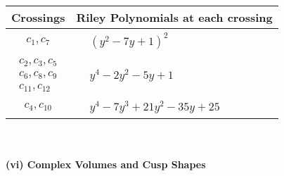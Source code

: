 \documentclass[1p]{elsarticle_modified}
\theoremstyle{definition}
\begin{document}
\begin{tabular}{m{50pt}|m{274pt}}
Crossings & \hspace{64pt}Riley Polynomials at each crossing \\
\hline $$\begin{aligned}c_{1},c_{7}\end{aligned}$$&$\begin{aligned}
&(y^2-7 y+1)^2
\end{aligned}$\\
\hline $$\begin{aligned}c_{2},c_{3},c_{5}\\c_{6},c_{8},c_{9}\\c_{11},c_{12}\end{aligned}$$&$\begin{aligned}
&y^4-2 y^2-5 y+1
\end{aligned}$\\
\hline $$\begin{aligned}c_{4},c_{10}\end{aligned}$$&$\begin{aligned}
&y^4-7 y^3+21 y^2-35 y+25
\end{aligned}$\\
\hline
\end{tabular}\\~\\
\newpage\flushleft \textbf{(vi) Complex Volumes and Cusp Shapes}
\end{document}
